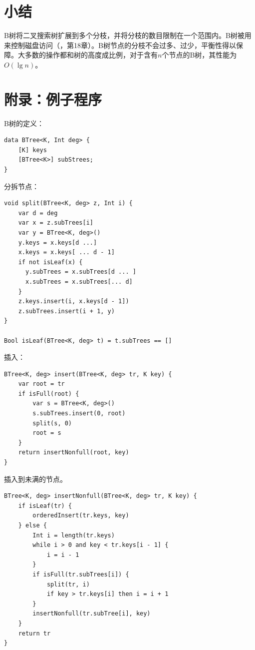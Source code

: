 \documentclass{ctexart}
\begin{document}
\begin{Exercise}
\end{Exercise}

\section{小结}

B树将二叉搜索树扩展到多个分枝，并将分枝的数目限制在一个范围内。B树被用来控制磁盘访问（\cite{CLRS}，第18章）。B树节点的分枝不会过多、过少，平衡性得以保障。大多数的操作都和树的高度成比例，对于含有$n$个节点的B树，其性能为$O(\lg n)$。

\section{附录：例子程序}

B树的定义：

\begin{lstlisting}[language = Bourbaki]
data BTree<K, Int deg> {
    [K] keys
    [BTree<K>] subStrees;
}
\end{lstlisting}

分拆节点：

\begin{lstlisting}[language = Bourbaki]
void split(BTree<K, deg> z, Int i) {
    var d = deg
    var x = z.subTrees[i]
    var y = BTree<K, deg>()
    y.keys = x.keys[d ...]
    x.keys = x.keys[ ... d - 1]
    if not isLeaf(x) {
      y.subTrees = x.subTrees[d ... ]
      x.subTrees = x.subTrees[... d]
    }
    z.keys.insert(i, x.keys[d - 1])
    z.subTrees.insert(i + 1, y)
}

Bool isLeaf(BTree<K, deg> t) = t.subTrees == []
\end{lstlisting}

插入：

\begin{lstlisting}[language = Bourbaki]
BTree<K, deg> insert(BTree<K, deg> tr, K key) {
    var root = tr
    if isFull(root) {
        var s = BTree<K, deg>()
        s.subTrees.insert(0, root)
        split(s, 0)
        root = s
    }
    return insertNonfull(root, key)
}
\end{lstlisting}

插入到未满的节点。

\begin{lstlisting}[language = Bourbaki]
BTree<K, deg> insertNonfull(BTree<K, deg> tr, K key) {
    if isLeaf(tr) {
        orderedInsert(tr.keys, key)
    } else {
        Int i = length(tr.keys)
        while i > 0 and key < tr.keys[i - 1] {
            i = i - 1
        }
        if isFull(tr.subTrees[i]) {
            split(tr, i)
            if key > tr.keys[i] then i = i + 1
        }
        insertNonfull(tr.subTree[i], key)
    }
    return tr
}
\end{lstlisting}
\end{document}
